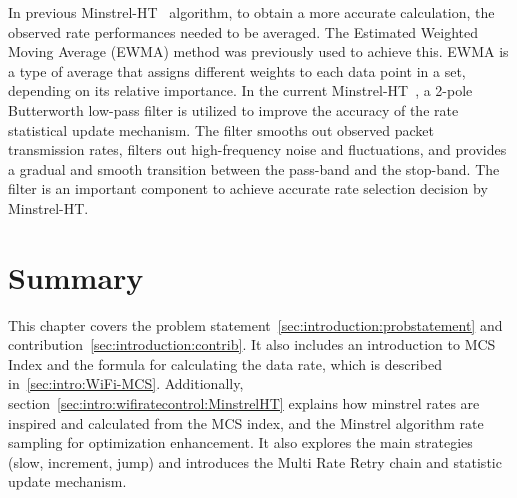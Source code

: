 In previous Minstrel-HT~\cite{MinstrelHT(2010)} algorithm, to obtain a more accurate calculation, the observed rate performances needed to be averaged. The Estimated Weighted Moving Average (EWMA) method was previously used to achieve this. EWMA is a type of average that assigns different weights to each data point in a set, depending on its relative importance.
In the current Minstrel-HT~\cite{MinstrelHT-patch}, a 2-pole Butterworth low-pass filter is utilized to improve the accuracy of the rate statistical update mechanism. The filter smooths out observed packet transmission rates, filters out high-frequency noise and fluctuations, and provides a gradual and smooth transition between the pass-band and the stop-band. The filter is an important component to achieve accurate rate selection decision by Minstrel-HT.
\newpage
\section{Summary}


This chapter covers the problem statement~\ref{sec:introduction:probstatement} and contribution~\ref{sec:introduction:contrib}. It also includes an introduction to MCS Index and the formula for calculating the data rate, which is described in~\ref{sec:intro:WiFi-MCS}. 
Additionally, section~\ref{sec:intro:wifiratecontrol:MinstrelHT} explains how minstrel rates are inspired and calculated from the MCS index, and the Minstrel algorithm rate sampling for optimization enhancement. It also explores the main strategies (slow, increment, jump) and introduces the Multi Rate Retry chain and statistic update mechanism.